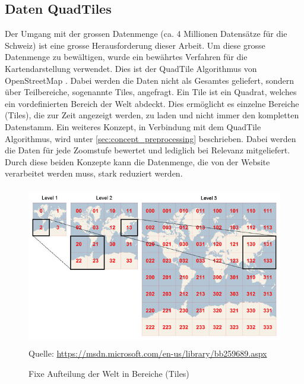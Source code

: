 \subsection{Daten QuadTiles}
\label{ch:datentiles}
Der Umgang mit der grossen Datenmenge (ca. 4 Millionen Datensätze für die Schweiz) ist eine grosse Herausforderung dieser Arbeit. Um diese grosse Datenmenge zu bewältigen, wurde ein bewährtes Verfahren für die Kartendarstellung verwendet. Dies ist der QuadTile Algorithmus von OpenStreetMap \citep{OSMQuadTiles}. Dabei werden die Daten nicht als Gesamtes geliefert, sondern über Teilbereiche, sogenannte Tiles, angefragt. Ein Tile ist ein Quadrat, welches ein vordefinierten Bereich der Welt abdeckt. Dies ermöglicht es einzelne Bereiche (Tiles), die zur Zeit angezeigt werden, zu laden und nicht immer den kompletten Datenstamm. Ein weiteres Konzept, in Verbindung mit dem QuadTile Algorithmus, wird unter \ref{sec:concept_preprocessing}  beschrieben. Dabei werden die Daten für jede Zoomstufe bewertet und lediglich bei Relevanz mitgeliefert. Durch diese beiden Konzepte kann die Datenmenge, die von der Website verarbeitet werden muss, stark reduziert werden.
\begin{figure}[H]
\centering
\includegraphics[height=7cm]{images/BingMapsTileSystem.jpg}
\\Quelle: \href{https://msdn.microsoft.com/en-us/library/bb259689.aspx}{https://msdn.microsoft.com/en-us/library/bb259689.aspx}
\caption{Fixe Aufteilung der Welt in Bereiche (Tiles)}
\label{fig:tilesystem}
\end{figure}
\noindent
